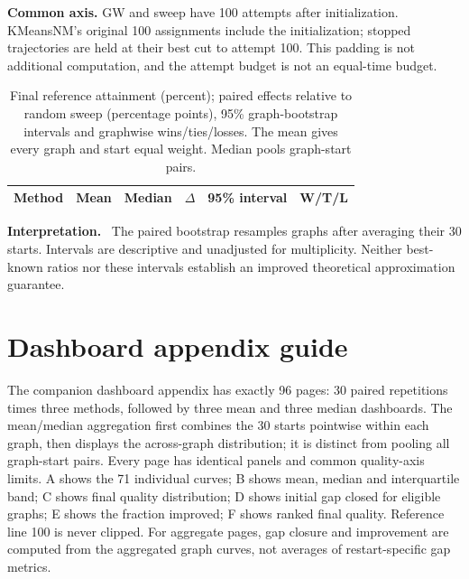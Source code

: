 \documentclass[11pt,a4paper]{article}
\begin{document}
\textbf{Common axis.} GW and sweep have 100 attempts after initialization. KMeansNM's original 100 assignments include the initialization; stopped trajectories are held at their best cut to attempt 100. This padding is not additional computation, and the attempt budget is not an equal-time budget.

\begin{table}[H]\centering\small
\caption{Final reference attainment (percent); paired effects relative to random sweep (percentage points), 95\% graph-bootstrap intervals and graphwise wins/ties/losses. The mean gives every graph and start equal weight. Median pools graph-start pairs.}
\begin{tabular*}{\linewidth}{@{\extracolsep{\fill}}lrrrrl@{}}
\toprule Method & Mean & Median & $\Delta$ & 95\% interval & W/T/L\\
\midrule

\bottomrule
\end{tabular*}
\end{table}
\textbf{Interpretation.} \PrincipalFinding\ The paired bootstrap resamples graphs after averaging their 30 starts. Intervals are descriptive and unadjusted for multiplicity. Neither best-known ratios nor these intervals establish an improved theoretical approximation guarantee.

\section{Dashboard appendix guide}
The companion dashboard appendix has exactly 96 pages: 30 paired repetitions times three methods, followed by three mean and three median dashboards. The mean/median aggregation first combines the 30 starts pointwise within each graph, then displays the across-graph distribution; it is distinct from pooling all graph-start pairs. Every page has identical panels and common quality-axis limits. A shows the 71 individual curves; B shows mean, median and interquartile band; C shows final quality distribution; D shows initial gap closed for eligible graphs; E shows the fraction improved; F shows ranked final quality. Reference line 100 is never clipped. For aggregate pages, gap closure and improvement are computed from the aggregated graph curves, not averages of restart-specific gap metrics.
\end{document}
